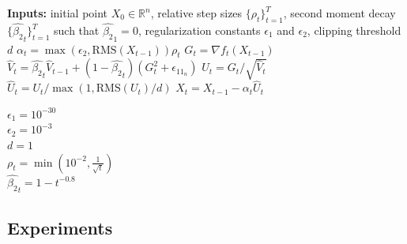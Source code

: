 \documentclass{article}
\begin{document}
\begin{algorithm}[t]
\begin{algorithmic}[1]
\STATE \textbf{Inputs:} initial point $X_0 \in \mathbb{R}^{n}$, relative step sizes $\{\rho_t\}_{t=1}^T$, second moment decay $\{\hat{\beta_2}_t\}_{t=1}^T$ such that $\hat{\beta_2}_1=0$, regularization constants $\epsilon_1$ and $\epsilon_2$, clipping threshold $d$
  \STATE $\alpha_t = \max\left(\epsilon_2, \mathrm{RMS}(X_{t-1})\right) \rho_t$
  \STATE $G_t = \nabla f_t(X_{t-1})$
  \STATE $\hat{V}_t =  \hat{\beta_2}_t \hat{V}_{t-1} +  (1 - \hat{\beta_2}_t)  (G_t^2 + \epsilon_11_{n})$
  \STATE $U_t = G_t / \sqrt{\hat{V}_t}$
  \STATE $\hat{U}_t = U_t / \max\left(1, \mathrm{RMS}(U_t)/d\right)$
  \STATE $X_t = X_{t-1} - \alpha_t \hat{U}_t$
\ENDFOR
\end{algorithmic}
\caption{Adafactor for weight vectors.}
\label{alg:adafactor-vector}
\end{algorithm}

\begin{algorithm}[t]
\begin{algorithmic}[1]
\STATE $\epsilon_1 = 10^{-30}$  \\ %
\STATE $\epsilon_2 = 10^{-3}$ \\
\STATE $d = 1$ \\
\STATE $\rho_t = \min\left(10^{-2}, \frac{1}{\sqrt{t}}\right)$ \\
\STATE $\hat{\beta_2}_t = 1-t^{-0.8}$ \\
\end{algorithmic}
\caption{Proposed hyperparameters for Adafactor}
\label{alg:adafactor-hp}
\end{algorithm}




\subsection{Experiments}
\label{relative_step_size_experiments}
\end{document}
